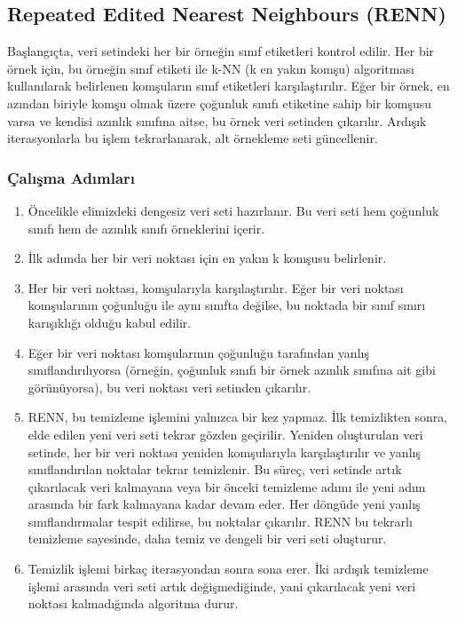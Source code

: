 \newpage

\subsection{Repeated Edited Nearest Neighbours (RENN)}
Başlangıçta, veri setindeki her bir örneğin sınıf etiketleri kontrol edilir. Her bir örnek için, bu örneğin sınıf etiketi ile k-NN (k en yakın komşu) algoritması kullanılarak belirlenen komşuların sınıf etiketleri karşılaştırılır. Eğer bir örnek, en azından biriyle komşu olmak üzere çoğunluk sınıfı etiketine sahip bir komşusu varsa ve kendisi azınlık sınıfına aitse, bu örnek veri setinden çıkarılır. Ardışık iterasyonlarla bu işlem tekrarlanarak, alt örnekleme seti güncellenir.

\subsubsection{Çalışma Adımları}

\begin{enumerate}
    \item Öncelikle elimizdeki dengesiz veri seti hazırlanır. Bu veri seti hem çoğunluk sınıfı hem de azınlık sınıfı örneklerini içerir.
    \item İlk adımda her bir veri noktası için en yakın k komşusu belirlenir. 
    \item Her bir veri noktası, komşularıyla karşılaştırılır. Eğer bir veri noktası komşularının çoğunluğu ile aynı sınıfta değilse, bu noktada bir sınıf sınırı karışıklığı olduğu kabul edilir.
    \item Eğer bir veri noktası komşularının çoğunluğu tarafından yanlış sınıflandırılıyorsa (örneğin, çoğunluk sınıfı bir örnek azınlık sınıfına ait gibi görünüyorsa), bu veri noktası veri setinden çıkarılır.
    \item RENN, bu temizleme işlemini yalnızca bir kez yapmaz. İlk temizlikten sonra, elde edilen yeni veri seti tekrar gözden geçirilir. Yeniden oluşturulan veri setinde, her bir veri noktası yeniden komşularıyla karşılaştırılır ve yanlış sınıflandırılan noktalar tekrar temizlenir. Bu süreç, veri setinde artık çıkarılacak veri kalmayana veya bir önceki temizleme adımı ile yeni adım arasında bir fark kalmayana kadar devam eder. Her döngüde yeni yanlış sınıflandırmalar tespit edilirse, bu noktalar çıkarılır. RENN bu tekrarlı temizleme sayesinde, daha temiz ve dengeli bir veri seti oluşturur.
    \item Temizlik işlemi birkaç iterasyondan sonra sona erer. İki ardışık temizleme işlemi arasında veri seti artık değişmediğinde, yani çıkarılacak yeni veri noktası kalmadığında algoritma durur.
\end{enumerate}

